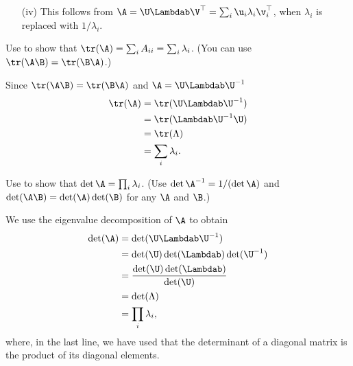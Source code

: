 \begin{exenumerate}
\begin{solution}
\begin{enumerate}
    \item[(iv)] This follows from $\A = \U \Lambdab \V^\top = \sum_i \u_i \lambda_i \v_i^\top$, when $\lambda_i$ is replaced with $1/\lambda_i$.
    \end{enumerate}
  \end{solution}  
\end{exenumerate}


\label{ex:trace-determinants-eigenvalues}
\begin{exenumerate}
\item Use  to show that $\tr(\A)=\sum_i A_{ii} = \sum_i\lambda_i$. (You can use $\tr(\A\B)=\tr(\B\A)$.)
  \begin{solution}
    Since $\tr(\A\B) = \tr(\B\A)$ and $\A = \U\Lambdab \U^{-1}$
    \begin{align}
      \tr(\A)  &= \tr(\U\Lambdab \U^{-1}) \\
               &= \tr(\Lambdab \U^{-1}\U) \\
               &= \tr(\Lambda)\\
               &= \sum_i \lambda_i.
    \end{align}
  \end{solution}

\item Use  to show that $\det \A = \prod_i \lambda_i$. (Use $\det \A^{-1}=1/(\det \A)$ and $\det(\A\B)=\det(\A)\det(\B)$ for any $\A$ and $\B$.)
  \begin{solution}
    We use the eigenvalue decomposition of $\A$ to obtain
    \begin{align}
      \det(\A) &= \det(\U\Lambdab \U^{-1})\\
               &= \det(\U)\det(\Lambdab)\det(\U^{-1}) \\
               &= \frac{\det(\U)\det(\Lambdab)}{\det(\U)}\\
               &= \det(\Lambda)\\
               &= \prod_i \lambda_i,
    \end{align}
    where, in the last line, we have used that the determinant of a diagonal matrix is the product of its diagonal elements.

  \end{solution}
\end{exenumerate}



